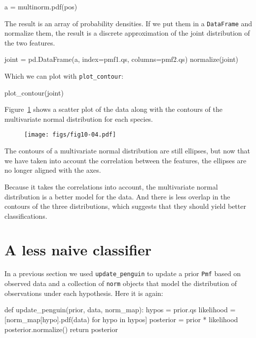 \documentclass[12pt]{book}
\theoremstyle{exercise}
\newcommand{\py}[1]{{\tt #1}}%
\begin{document}
\begin{code}
a = multinorm.pdf(pos)
\end{code}

The result is an array of probability densities. If we put them in a
\py{DataFrame} and normalize them, the result is a
discrete approximation of the joint distribution of the two features.

\begin{code}
joint = pd.DataFrame(a, index=pmf1.qs, columns=pmf2.qs)
normalize(joint)
\end{code}

Which we can plot with \py{plot_contour}:

\begin{code}
plot_contour(joint)
\end{code}

Figure~\ref{fig10-04} shows a scatter plot of the data along with the
contours of the multivariate normal distribution for each species.

\begin{figure}
\centerline{\texttt{[image: figs/fig10-04.pdf]}}
\caption{}
\label{fig10-04}
\end{figure}

The contours of a multivariate normal distribution are still ellipses,
but now that we have taken into account the correlation between the
features, the ellipses are no longer aligned with the axes.

Because it takes the correlations into account, the multivariate normal
distribution is a better model for the data. And there is less overlap
in the contours of the three distributions, which suggests that they
should yield better classifications.

\section{A less naive classifier}
\label{a-less-naive-classifier}

In a previous section we used \py{update_penguin}
to update a prior \py{Pmf} based on observed data
and a collection of \py{norm} objects that model
the distribution of observations under each hypothesis. Here it is
again:

\begin{code}
def update_penguin(prior, data, norm_map):
    hypos = prior.qs
    likelihood = [norm_map[hypo].pdf(data) for hypo in hypos]
    posterior = prior * likelihood
    posterior.normalize()
    return posterior
\end{code}
\end{document}
